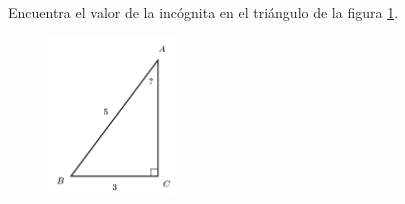 \question[15]  Encuentra el valor de la incógnita en el triángulo de la figura \ref{fig:angle_functrig_02}.
\begin{figure}[H]
    \begin{center}
        \includegraphics[width=0.3\textwidth]{../images/angle_functrig_02.png}
    \end{center}
    \caption{}
    \label{fig:angle_functrig_02}
\end{figure}